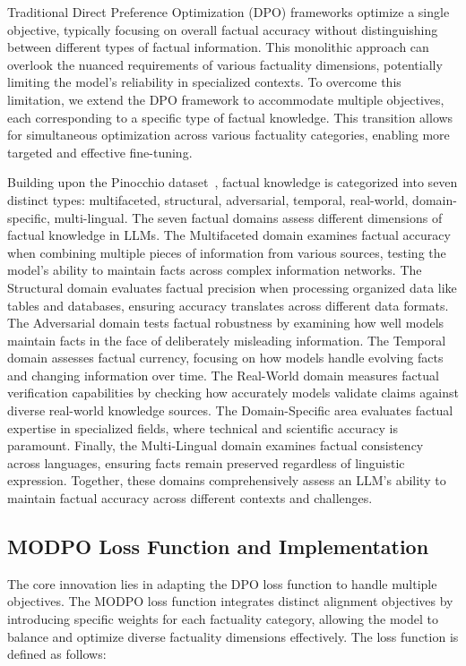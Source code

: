 \documentclass{article}
\begin{document}
Traditional Direct Preference Optimization (DPO) frameworks optimize a single objective, typically focusing on overall factual accuracy without distinguishing between different types of factual information. This monolithic approach can overlook the nuanced requirements of various factuality dimensions, potentially limiting the model's reliability in specialized contexts. To overcome this limitation, we extend the DPO framework to accommodate multiple objectives, each corresponding to a specific type of factual knowledge. This transition allows for simultaneous optimization across various factuality categories, enabling more targeted and effective fine-tuning.

Building upon the Pinocchio dataset~\cite{UNDERSTANDINGFACTUALKNOWLEDGELARGELANGUAGE2024a}, factual knowledge is categorized into seven distinct types: multifaceted, structural, adversarial, temporal, real-world, domain-specific, multi-lingual. The seven factual domains assess different dimensions of factual knowledge in LLMs. The Multifaceted domain examines factual accuracy when combining multiple pieces of information from various sources, testing the model's ability to maintain facts across complex information networks. The Structural domain evaluates factual precision when processing organized data like tables and databases, ensuring accuracy translates across different data formats. The Adversarial domain tests factual robustness by examining how well models maintain facts in the face of deliberately misleading information. The Temporal domain assesses factual currency, focusing on how models handle evolving facts and changing information over time. The Real-World domain measures factual verification capabilities by checking how accurately models validate claims against diverse real-world knowledge sources. The Domain-Specific area evaluates factual expertise in specialized fields, where technical and scientific accuracy is paramount. Finally, the Multi-Lingual domain examines factual consistency across languages, ensuring facts remain preserved regardless of linguistic expression. Together, these domains comprehensively assess an LLM's ability to maintain factual accuracy across different contexts and challenges.

\subsection{MODPO Loss Function and Implementation}

The core innovation lies in adapting the DPO loss function to handle multiple objectives. The MODPO loss function integrates distinct alignment objectives by introducing specific weights for each factuality category, allowing the model to balance and optimize diverse factuality dimensions effectively. The loss function is defined as follows:
\end{document}
